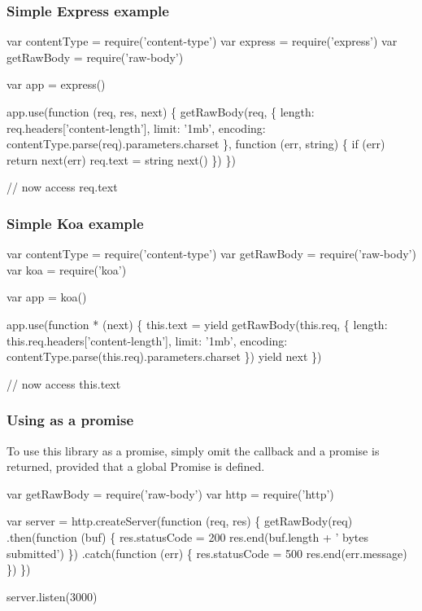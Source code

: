 \subsubsection*{Simple Express example}


\begin{DoxyCode}
var contentType = require('content-type')
var express = require('express')
var getRawBody = require('raw-body')

var app = express()

app.use(function (req, res, next) \{
  getRawBody(req, \{
    length: req.headers['content-length'],
    limit: '1mb',
    encoding: contentType.parse(req).parameters.charset
  \}, function (err, string) \{
    if (err) return next(err)
    req.text = string
    next()
  \})
\})

// now access req.text
\end{DoxyCode}


\subsubsection*{Simple Koa example}


\begin{DoxyCode}
var contentType = require('content-type')
var getRawBody = require('raw-body')
var koa = require('koa')

var app = koa()

app.use(function * (next) \{
  this.text = yield getRawBody(this.req, \{
    length: this.req.headers['content-length'],
    limit: '1mb',
    encoding: contentType.parse(this.req).parameters.charset
  \})
  yield next
\})

// now access this.text
\end{DoxyCode}


\subsubsection*{Using as a promise}

To use this library as a promise, simply omit the {\ttfamily callback} and a promise is returned, provided that a global {\ttfamily Promise} is defined.


\begin{DoxyCode}
var getRawBody = require('raw-body')
var http = require('http')

var server = http.createServer(function (req, res) \{
  getRawBody(req)
    .then(function (buf) \{
      res.statusCode = 200
      res.end(buf.length + ' bytes submitted')
    \})
    .catch(function (err) \{
      res.statusCode = 500
      res.end(err.message)
    \})
\})

server.listen(3000)
\end{DoxyCode}


